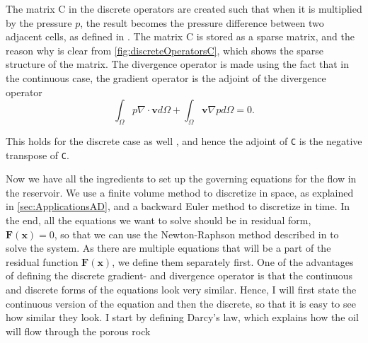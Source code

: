 The matrix C in the discrete operators are created such that when it is multiplied by the pressure $p$, the result becomes the pressure difference between two adjacent cells, as defined in . The matrix C is stored as a sparse matrix, and the reason why is clear from \autoref{fig:discreteOperatorsC}, which shows the sparse  structure of the matrix. The divergence operator is made using the fact that in the continuous case, the gradient operator is the adjoint of the divergence operator
\begin{equation*}
    \int_\Omega p\nabla \cdot \textbf{v} d\Omega + \int_\Omega \textbf{v}\nabla p d\Omega = 0.
\end{equation*}

This holds for the discrete case as well \citep{lieMrstUrl}, and hence the adjoint of \texttt{C} is the negative transpose of \texttt{C}.


Now we have all the ingredients to set up the governing equations for the flow in the reservoir. We use a finite volume method to discretize in space, as explained in \autoref{sec:ApplicationsAD}, and a backward Euler method to discretize in time. In the end, all the equations we want to solve should be in residual form, $\boldsymbol{F}(\boldsymbol{x}) = 0$, so that we can use the Newton-Raphson method described in  to solve the system. As there are multiple equations that will be a part of the residual function $\boldsymbol{F}(\boldsymbol{x})$, we define them separately first. One of the advantages of defining the discrete gradient- and divergence operator is that the continuous and discrete forms of the equations look very similar. Hence, I will first state the continuous version of the equation and then the discrete, so that it is easy to see how similar they look. I start by defining Darcy's law, which explains how the oil will flow through the porous rock

